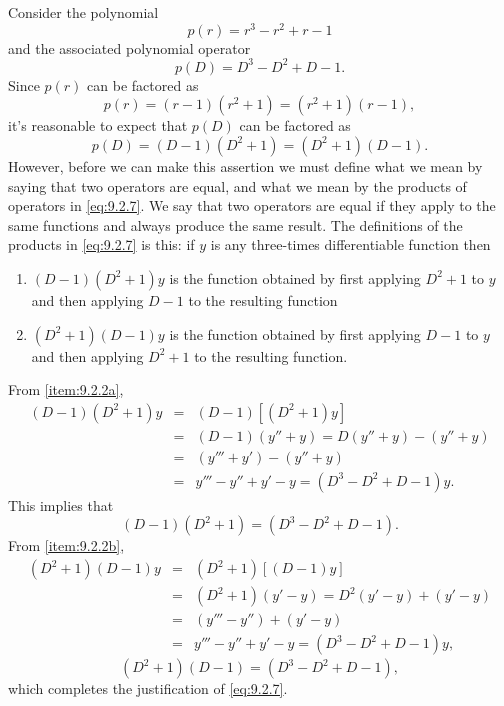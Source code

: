\documentclass{ximera}
\begin{document}
\begin{example}\label{example:9.2.2}
Consider the polynomial
$$
p(r)=r^3-r^2+r-1
$$
and the associated polynomial operator
$$
p(D)=D^3-D^2+D-1.
$$
Since $p(r)$ can be factored as
$$
p(r)=(r-1)(r^2+1)=(r^2+1)(r-1),
$$
it's reasonable to expect that $p(D)$ can be factored as
\begin{equation} \label{eq:9.2.7}
p(D)=(D-1)(D^2+1)=(D^2+1)(D-1).
\end{equation}
However, before we can make this assertion we must define
 what we mean by saying that two operators are equal, and what we mean
by the products of operators in \eqref{eq:9.2.7}. We say that two
operators are equal if they apply to the same functions and always
produce the same result. The definitions of the products in
\eqref{eq:9.2.7} is this: if $y$ is any three-times differentiable
function then
\begin{enumerate}
\item\label{item:9.2.2a} %
$(D-1)(D^2+1)y$
is the function obtained by first applying $D^2+1$ to $y$ and then
applying $D-1$ to the resulting function
\item\label{item:9.2.2b} %
$(D^2+1)(D-1)y$
is the function obtained by first applying $D-1$ to $y$ and then
applying $D^2+1$ to the resulting function.
\end{enumerate}
From \ref{item:9.2.2a},
\begin{equation} \label{eq:9.2.8}
\begin{array}{rcl}
(D-1)(D^2+1)y&=&(D-1)[(D^2+1)y]\\
&=&(D-1)(y''+y)=D(y''+y)-(y''+y)\\&=&(y'''+y')-(y''+y)\\
&=&y'''-y''+y'-y=(D^3-D^2+D-1)y.
\end{array}
\end{equation}
This implies that
$$
(D-1)(D^2+1)=(D^3-D^2+D-1).
$$
From \ref{item:9.2.2b},
\begin{equation} \label{eq:9.2.9}
\begin{array}{rcl}
(D^2+1)(D-1)y&=&(D^2+1)[(D-1)y]\\
&=&(D^2+1)(y'-y)=D^2(y'-y)+(y'-y)\\&=&(y'''-y'')+(y'-y)\\
&=&y'''-y''+y'-y=(D^3-D^2+D-1)y,
\end{array}
\end{equation}
$$
(D^2+1)(D-1)=(D^3-D^2+D-1),
$$
which completes the justification of \eqref{eq:9.2.7}.
\end{example}
\end{document}
